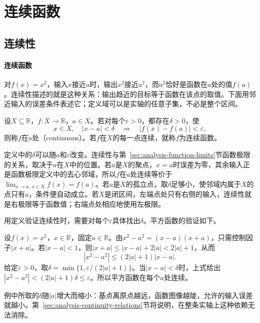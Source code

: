 \section{连续函数}
\label{sec:analysis-local-models}
\label{sec:analysis-metric-continuity-extrema}

\subsection{连续性}

\paragraph{连续函数}
对$f(x)=x^2$，输入$x$接近$a$时，输出$x^2$接近$a^2$，而$a^2$恰好是函数在$a$处的值$f(a)$。连续性描述的就是这种关系：输出趋近的目标等于函数在该点的取值。下面用邻近输入的误差条件表述它；定义域可以是实轴的任意子集，不必是整个区间。
\begin{definition}[连续函数]
\label{def:analysis-continuity}
设$X\subseteq\mathbb R$，$f:X\to\mathbb R$，$a\in X$。若对每个$\varepsilon>0$，都存在$\delta>0$，使
\[
 x\in X,\quad |x-a|<\delta
 \quad\Longrightarrow\quad |f(x)-f(a)|<\varepsilon,
\]
则称$f$在$a$处（continuous）。若$f$在$X$的每一点连续，就称$f$为连续函数。
\end{definition}
定义中的$\delta$可以随$a$和$\varepsilon$改变。连续性与第~\ref{sec:analysis-function-limits}节函数极限的关系，取决于$a$在$X$中的位置。若$a$是$X$的聚点，$x=a$时误差为零，其余输入正是函数极限定义中的去心邻域，所以$f$在$a$处连续等价于$\lim_{x\to a,\,x\in X}f(x)=f(a)$。若$a$是$X$的孤立点，取$\delta$足够小，使邻域内属于$X$的点只有$a$，条件便自动成立。若$X$是闭区间，左端点处只有右侧的输入，连续性就是右极限等于函数值；右端点处相应地使用左极限。

用定义验证连续性时，需要对每个$\varepsilon$具体找出$\delta$。平方函数的验证如下。
\begin{example}[平方函数在每一点连续]
\label{ex:analysis-square-pointwise-continuity}
设$f(x)=x^2$，$x\in\mathbb R$，固定$a\in\mathbb R$。由$x^2-a^2=(x-a)(x+a)$，只需控制因子$|x+a|$。若$|x-a|<1$，则$|x+a|\leq|x-a|+2|a|<2|a|+1$，从而
\[
 |x^2-a^2|\leq(2|a|+1)|x-a|.
\]
给定$\varepsilon>0$，取$\delta=\min\{1,\varepsilon/(2|a|+1)\}$。当$|x-a|<\delta$时，上式给出$|x^2-a^2|<(2|a|+1)\delta\leq\varepsilon$。所以平方函数在每个$a$处连续。
\end{example}
例中所取的$\delta$随$|a|$增大而缩小：基点离原点越远，函数图像越陡，允许的输入误差就越小。第~\ref{sec:analysis-continuity-relations}节将说明，在整条实轴上这种依赖无法消除。

